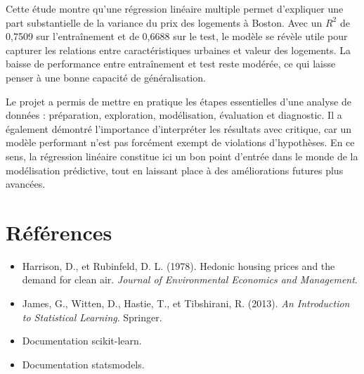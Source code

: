 \documentclass[a4paper,12pt]{article}
\begin{document}
Cette étude montre qu’une régression linéaire multiple permet d’expliquer une part substantielle de la variance du prix des logements à Boston. Avec un $R^2$ de 0,7509 sur l’entraînement et de 0,6688 sur le test, le modèle se révèle utile pour capturer les relations entre caractéristiques urbaines et valeur des logements. La baisse de performance entre entraînement et test reste modérée, ce qui laisse penser à une bonne capacité de généralisation.

Le projet a permis de mettre en pratique les étapes essentielles d’une analyse de données : préparation, exploration, modélisation, évaluation et diagnostic. Il a également démontré l’importance d’interpréter les résultats avec critique, car un modèle performant n’est pas forcément exempt de violations d’hypothèses. En ce sens, la régression linéaire constitue ici un bon point d’entrée dans le monde de la modélisation prédictive, tout en laissant place à des améliorations futures plus avancées.

\section{Références}
\begin{itemize}
    \item Harrison, D., et Rubinfeld, D. L. (1978). Hedonic housing prices and the demand for clean air. \textit{Journal of Environmental Economics and Management}. \\
    \item James, G., Witten, D., Hastie, T., et Tibshirani, R. (2013). \textit{An Introduction to Statistical Learning}. Springer. \\
    \item Documentation scikit-learn. \\
    \item Documentation statsmodels.
\end{itemize}
\end{document}
